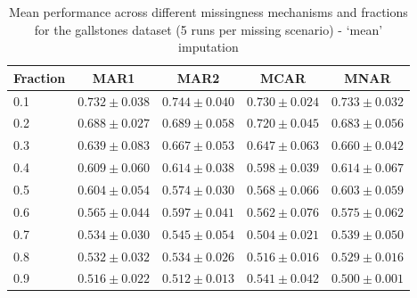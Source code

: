 \documentclass{article}
\begin{document}
\begin{table}[p]
\centering
\caption{Mean performance across different missingness mechanisms and fractions for the gallstones dataset (5 runs per missing scenario) - `mean' imputation}
\label{tab:gall-c-mean}
\vspace{0.5em}
\begin{tabular}{lcccc}
\toprule
\textbf{Fraction} & \textbf{MAR1} & \textbf{MAR2} & \textbf{MCAR} & \textbf{MNAR} \\ 
\midrule
0.1 & $0.732 \pm 0.038$ & $0.744 \pm 0.040$ & $0.730 \pm 0.024$ & $0.733 \pm 0.032$ \\ 
0.2 & $0.688 \pm 0.027$ & $0.689 \pm 0.058$ & $0.720 \pm 0.045$ & $0.683 \pm 0.056$ \\ 
0.3 & $0.639 \pm 0.083$ & $0.667 \pm 0.053$ & $0.647 \pm 0.063$ & $0.660 \pm 0.042$ \\ 
0.4 & $0.609 \pm 0.060$ & $0.614 \pm 0.038$ & $0.598 \pm 0.039$ & $0.614 \pm 0.067$ \\ 
0.5 & $0.604 \pm 0.054$ & $0.574 \pm 0.030$ & $0.568 \pm 0.066$ & $0.603 \pm 0.059$ \\ 
0.6 & $0.565 \pm 0.044$ & $0.597 \pm 0.041$ & $0.562 \pm 0.076$ & $0.575 \pm 0.062$ \\ 
0.7 & $0.534 \pm 0.030$ & $0.545 \pm 0.054$ & $0.504 \pm 0.021$ & $0.539 \pm 0.050$ \\ 
0.8 & $0.532 \pm 0.032$ & $0.534 \pm 0.026$ & $0.516 \pm 0.016$ & $0.529 \pm 0.016$ \\ 
0.9 & $0.516 \pm 0.022$ & $0.512 \pm 0.013$ & $0.541 \pm 0.042$ & $0.500 \pm 0.001$ \\ 
\bottomrule
\end{tabular}
\end{table}
\end{document}
